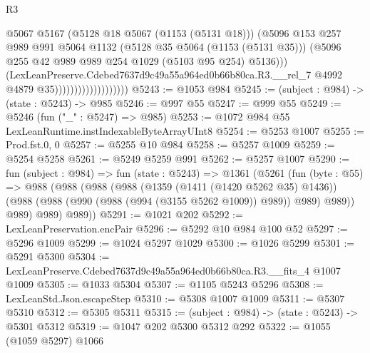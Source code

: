 \begin{lexlean}{R3}
\begin{coremodule}
                                          @5067
                                          @5167
                                          (@5128 @18 @5067 (@1153 (@5131 @18)))
                                          (@5096
                                            @153
                                            @257
                                            @989
                                            @991
                                            @5064
                                            @1132
                                            (@5128 @35 @5064 (@1153 (@5131 @35)))
                                            (@5096
                                              @255
                                              @42
                                              @989
                                              @989
                                              @254
                                              @1029
                                              (@5103 @95 @254)
                                              @5136)))
                                        (LexLeanPreserve.Cdebed7637d9c49a55a964ed0b66b80ca.R3.__rel_7
                                          @4992
                                          @4879
                                          @35)))))))))))))))))))
@5243 := @1053 @984
@5245 := (subject : @984) -> (state : @5243) -> @985
@5246 := @997 @55
@5247 := @999 @55
@5249 := @5246 (fun ("_" : @5247) => @985)
@5253 := @1072 @984 @55 LexLeanRuntime.instIndexableByteArrayUInt8
@5254 := @5253 @1007
@5255 := Prod.fst.{0, 0}
@5257 := @5255 @10 @984
@5258 := @5257 @1009
@5259 := @5254 @5258
@5261 := @5249 @5259 @991
@5262 := @5257 @1007
@5290 := fun (subject : @984) =>
  fun (state : @5243) =>
  @1361
    (@5261
      (fun (byte : @55) =>
      @988
        (@988
          (@988
            (@988
              (@1359 (@1411 (@1420 @5262 @35) @1436))
              (@988 (@988 (@990 (@988 (@994 (@3155 @5262 @1009)) @989)) @989) @989))
            @989)
          @989)
        @989))
@5291 := @1021 @202
@5292 := LexLeanPreservation.encPair
@5296 := @5292 @10 @984 @100 @52
@5297 := @5296 @1009
@5299 := @1024 @5297 @1029
@5300 := @1026 @5299
@5301 := @5291 @5300
@5304 := LexLeanPreserve.Cdebed7637d9c49a55a964ed0b66b80ca.R3.__fits_4 @1007 @1009
@5305 := @1033 @5304
@5307 := @1105 @5243 @5296
@5308 := LexLeanStd.Json.escapeStep
@5310 := @5308 @1007 @1009
@5311 := @5307 @5310
@5312 := @5305 @5311
@5315 := (subject : @984) -> (state : @5243) -> @5301 @5312
@5319 := @1047 @202 @5300 @5312 @292
@5322 := @1055 (@1059 @5297) @1066

\end{coremodule}
\end{lexlean}
